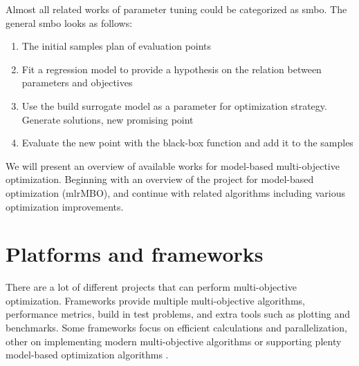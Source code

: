 

        Almost all related works of parameter tuning could be categorized as \gls{smbo}\cite{JonesSW98}.
        The general \gls{smbo} looks as follows:
        \begin{enumerate}
            \item The initial samples plan of evaluation points
            \item Fit a regression model to provide a hypothesis on the relation between parameters and objectives
            \item Use the build surrogate model as a parameter for optimization strategy. Generate solutions, new promising point
            \item Evaluate the new point with the black-box function and add it to the samples
        \end{enumerate}
        We will present an overview of available works for model-based multi-objective optimization. Beginning with an overview of the project for model-based optimization (mlrMBO), and continue with related algorithms including various optimization improvements.




    \section{Platforms and frameworks}
        There are a lot of different projects that can perform multi-objective optimization. Frameworks provide multiple multi-objective algorithms, performance metrics, build in test problems, and extra tools such as plotting and benchmarks. Some frameworks focus on efficient calculations and parallelization\cite{francesco_biscani_2019}, other on implementing modern multi-objective algorithms \cite{benitezhidalgo2019jmetalpy, TianPlatEMO} or supporting plenty model-based optimization algorithms \cite{BischlmlrMBO}.

